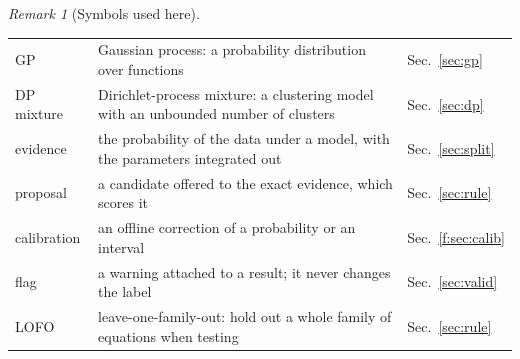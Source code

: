 \documentclass[11pt]{article}
\theoremstyle{plain}
\theoremstyle{definition}
\theoremstyle{remark}
\newtheorem{remark}[theorem]{Remark}
\newenvironment{symbols}{\begin{remark}[Symbols used here]}{\end{remark}}
\begin{document}
\begin{symbols}
\begin{tabular}{@{}L{2.6cm}L{6.0cm}L{4.3cm}@{}}
GP & Gaussian process: a probability distribution over functions & Sec.~\ref{sec:gp}\\
DP mixture & Dirichlet-process mixture: a clustering model with an unbounded number of clusters & Sec.~\ref{sec:dp}\\
evidence & the probability of the data under a model, with the parameters integrated out & Sec.~\ref{sec:split}\\
proposal & a candidate offered to the exact evidence, which scores it & Sec.~\ref{sec:rule}\\
calibration & an offline correction of a probability or an interval & Sec.~\ref{f:sec:calib}\\
flag & a warning attached to a result; it never changes the label & Sec.~\ref{sec:valid}\\
LOFO & leave-one-family-out: hold out a whole family of equations when testing & Sec.~\ref{sec:rule}\\
\end{tabular}
\end{symbols}
\end{document}
